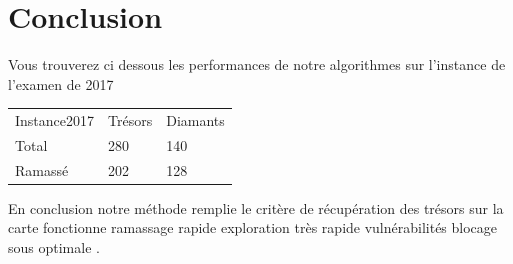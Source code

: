 \documentclass[10pt]{article}
\newcommand\tab[1][0.65cm]{\hspace*{#1}}
\begin{document}
\section{Conclusion}
\tab Vous trouverez ci dessous les performances de notre algorithmes sur l'instance de l'examen de 2017\\
\begin{center}
\begin{tabular}{lll}
   Instance2017 & Trésors & Diamants \\
   Total & 280 & 140\\
   Ramassé & 202 & 128 \\
\end{tabular}
\end{center}
\tab
En conclusion notre méthode remplie le critère de récupération des trésors sur la carte fonctionne ramassage rapide 
exploration très rapide vulnérabilités 
blocage sous optimale .



	
\end{document}
